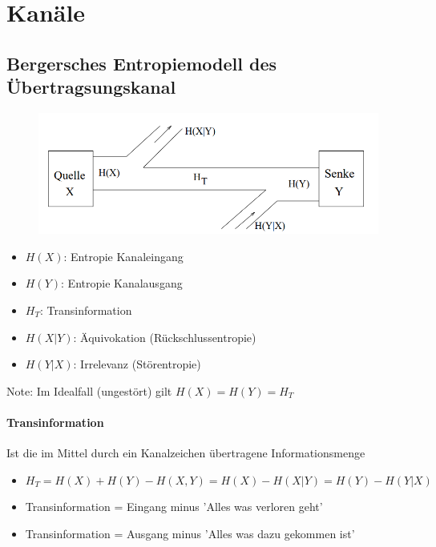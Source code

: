 \documentclass[12pt,a4paper]{article}
\begin{document}
\section{Kanäle}
\subsection{Bergersches Entropiemodell des Übertragsungskanal}
\begin{figure}[H]
\centering
\includegraphics[scale=0.5]{./resources/berg_mod.png}
\end{figure}
\begin{itemize}
\item $H(X)$: Entropie Kanaleingang
\item $H(Y)$: Entropie Kanalausgang
\item $H_T$: Transinformation
\item $H(X\vert Y)$: Äquivokation (Rückschlussentropie)
\item $H(Y\vert X)$: Irrelevanz (Störentropie)
\end{itemize}
Note: Im Idealfall (ungestört) gilt $H(X) = H(Y) = H_T$

\paragraph{Transinformation\\}
Ist die im Mittel durch ein Kanalzeichen übertragene Informationsmenge
\begin{itemize}
\item $H_T = H(X) + H(Y) - H(X,Y) = H(X) - H(X \vert Y) = H(Y) - H(Y \vert X)$
\item Transinformation = Eingang minus 'Alles was verloren geht'
\item Transinformation = Ausgang minus 'Alles was dazu gekommen ist'
\end{itemize}
\end{document}

